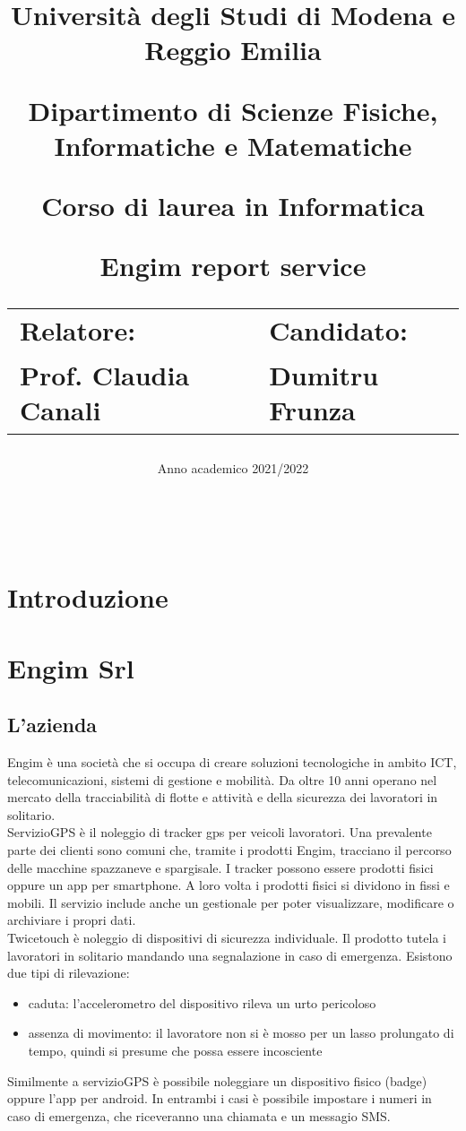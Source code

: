 \documentclass[12pt]{article}
\author{}
\title{
    \huge 
        \textbf{Università degli Studi di Modena e Reggio Emilia}
    \large
        \par Dipartimento di Scienze Fisiche, Informatiche e Matematiche
        \par Corso di laurea in Informatica
    \vfil
        \huge \par \textbf{Engim report service}
    \vfil
    \normalsize
    \begin{tabular}{lp{0.4\textwidth}l}
      Relatore: & & Candidato: \\
      Prof. Claudia Canali & &  Dumitru Frunza \\
      \end{tabular}
}
\date{Anno academico 2021/2022}
\begin{document}
\maketitle
\thispagestyle{empty}
\newpage 
\thispagestyle{empty}
\
\newpage
{}
\addtocounter{page}{0}
\listoffigures
\newpage
{}
\tableofcontents
{}
\newpage
{}
\addtocounter{page}{0}

\section{Introduzione}
\section{Engim Srl}
\subsection{L'azienda}
Engim è una società che si occupa di creare soluzioni tecnologiche in ambito 
ICT, telecomunicazioni, sistemi di gestione e mobilità. Da oltre 10 anni operano 
nel mercato della tracciabilità di flotte e attività e della 
sicurezza dei lavoratori in solitario.
\\ ServizioGPS è il noleggio di tracker gps per veicoli lavoratori. 
Una prevalente parte dei clienti sono comuni che, tramite i prodotti Engim, 
tracciano il percorso delle macchine spazzaneve e spargisale.
I tracker possono essere prodotti fisici oppure un app per smartphone. A loro 
volta i prodotti fisici si dividono in fissi e mobili. Il servizio include
anche un gestionale per poter visualizzare, modificare o archiviare i propri dati.
\\ Twicetouch è noleggio di dispositivi di sicurezza individuale.
Il prodotto tutela i lavoratori in solitario mandando una segnalazione in caso di
emergenza. Esistono due tipi di rilevazione: 
\begin{itemize}
  \item caduta: l'accelerometro del dispositivo rileva un urto pericoloso
  \item assenza di movimento: il lavoratore non si è mosso per un lasso prolungato di tempo, 
  quindi si presume che possa essere incosciente
\end{itemize}
Similmente a servizioGPS è possibile noleggiare un dispositivo fisico (badge) oppure
l'app per android. In entrambi i casi è possibile impostare i numeri in caso di 
emergenza, che riceveranno una chiamata e un messagio SMS.
\end{document}
